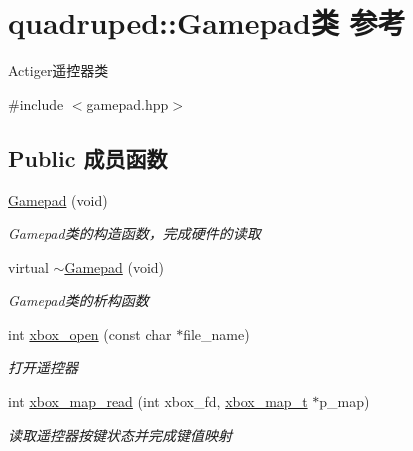 \hypertarget{classquadruped_1_1Gamepad}{}\section{quadruped\+:\+:Gamepad类 参考}
\label{classquadruped_1_1Gamepad}


Actiger遥控器类  




{\ttfamily \#include $<$gamepad.\+hpp$>$}

\subsection*{Public 成员函数}
\begin{DoxyCompactItemize}
\item 
\mbox{\label{classquadruped_1_1Gamepad_a299e3657b0c2a2d0252d307808e1b5d5}} 
\hyperlink{classquadruped_1_1Gamepad_a299e3657b0c2a2d0252d307808e1b5d5}{Gamepad} (void)
\begin{DoxyCompactList}\small\item\em Gamepad类的构造函数，完成硬件的读取 \end{DoxyCompactList}\item 
\mbox{\label{classquadruped_1_1Gamepad_afde709704acc2d1219758ed25004adfd}} 
virtual \hyperlink{classquadruped_1_1Gamepad_afde709704acc2d1219758ed25004adfd}{$\sim$\+Gamepad} (void)
\begin{DoxyCompactList}\small\item\em Gamepad类的析构函数 \end{DoxyCompactList}\item 
int \hyperlink{classquadruped_1_1Gamepad_a45193124f6e45a794fff7770d48bb1c4}{xbox\+\_\+open} (const char $\ast$file\+\_\+name)
\begin{DoxyCompactList}\small\item\em 打开遥控器 \end{DoxyCompactList}\item 
int \hyperlink{classquadruped_1_1Gamepad_a0a3c2f9e2e580af60d3d961cd7c961f5}{xbox\+\_\+map\+\_\+read} (int xbox\+\_\+fd, \hyperlink{structxbox__map__t}{xbox\+\_\+map\+\_\+t} $\ast$p\+\_\+map)
\begin{DoxyCompactList}\small\item\em 读取遥控器按键状态并完成键值映射 \end{DoxyCompactList}\item 

\end{DoxyCompactItemize}
